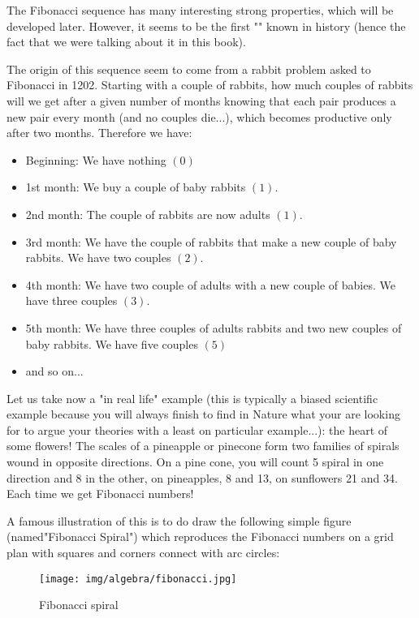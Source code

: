 	The Fibonacci sequence has many interesting strong properties, which will be developed later. However, it seems to be the first "" known in history (hence the fact that we were talking about it in this book). 
	
	The origin of this sequence seem to come from a rabbit problem asked to Fibonacci in 1202. Starting with a couple of rabbits, how much couples of rabbits will we get after a given number of months knowing that each pair produces a new pair every month (and no couples die...), which becomes productive only after two months. Therefore we have:
	\begin{itemize}
		\item Beginning: We have nothing $(0)$
		\item 1st month: We buy a couple of baby rabbits $(1)$.
		\item 2nd month: The couple of rabbits are now adults $(1)$.
		\item 3rd month: We have the couple of rabbits that make a new couple of baby rabbits. We have two couples $(2)$.
		\item 4th month: We have two couple of adults with a new couple of babies. We have three couples $(3)$.
		\item 5th month: We have three couples of adults rabbits and two new couples of baby rabbits. We have five couples $(5)$
		\item and so on...
	\end{itemize}
	
	Let us take now a "in real life" example (this is typically a biased scientific example because you will always finish to find in Nature what your are looking for to argue your theories with a least on particular example...): the heart of some flowers! The scales of a pineapple or pinecone form two families of spirals wound in opposite directions. On a pine cone, you will count 5 spiral in one direction and 8 in the other, on pineapples, 8 and 13, on sunflowers 21 and 34. Each time we get Fibonacci numbers!
	
	A famous illustration of this is to do draw the following simple figure (named"Fibonacci Spiral") which reproduces the Fibonacci numbers on a grid plan with squares and corners connect with arc circles:
	
\begin{figure}[H]
\centering
\texttt{[image: img/algebra/fibonacci.jpg]}
\caption{Fibonacci spiral}
\end{figure}

